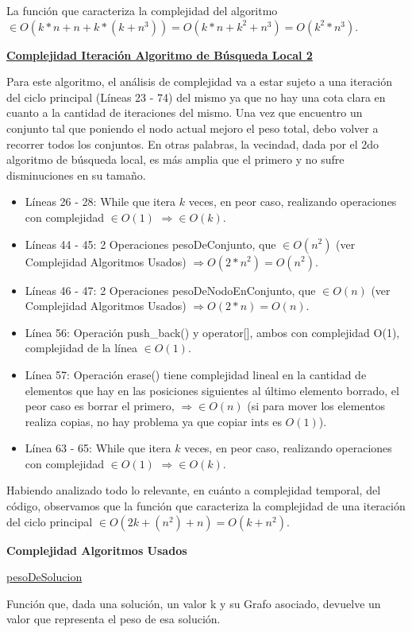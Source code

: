 \documentclass[10pt,a4paper]{article}
\begin{document}
La función que caracteriza la complejidad del algoritmo $\in O(k*n + n + k*(k + n^3)) = O(k*n + k^2 + n^3) = O(k^2 * n^3)$.

\newpage
\noindent \underline{\textbf{Complejidad Iteración Algoritmo de Búsqueda Local 2}}

Para este algoritmo, el análisis de complejidad va a estar sujeto a una iteración del ciclo principal (Líneas 23 - 74) del mismo ya que no hay una cota clara en cuanto a la cantidad de iteraciones del mismo. Una vez que encuentro un conjunto tal que poniendo el nodo actual mejoro el peso total, debo volver a recorrer todos los conjuntos. En otras palabras, la vecindad, dada por el 2do algoritmo de búsqueda local, es más amplia que el primero y no sufre disminuciones en su tamaño.

\begin{itemize}
\item Líneas 26 - 28: While que itera $k$ veces, en peor caso, realizando operaciones con complejidad $\in O(1)$ $\Rightarrow \in O(k)$.
\item Líneas 44 - 45: 2 Operaciones pesoDeConjunto, que $\in O(n^2)$ (ver Complejidad Algoritmos Usados) $\Rightarrow O(2*n^2) = O(n^2)$.
\item Líneas 46 - 47: 2 Operaciones pesoDeNodoEnConjunto, que $\in O(n)$ (ver Complejidad Algoritmos Usados) $\Rightarrow O(2*n) = O(n)$.
\item Línea 56: Operación push\_back() y operator[], ambos con complejidad O(1), complejidad de la línea $\in O(1)$.
\item Línea 57: Operación erase() tiene complejidad lineal en la cantidad de elementos que hay en las posiciones siguientes al último elemento borrado, el peor caso es borrar el primero, $\Rightarrow \in O(n)$ (si para mover los elementos realiza copias, no hay problema ya que copiar ints es $O(1)$).
\item Línea 63 - 65: While que itera $k$ veces, en peor caso, realizando operaciones con complejidad $\in O(1)$ $\Rightarrow \in O(k)$.
\end{itemize}

Habiendo analizado todo lo relevante, en cuánto a complejidad temporal, del código, observamos que la función que caracteriza la complejidad de una iteración del ciclo principal $\in O(2k + (n^2) + n) = O(k + n^2)$.

\textbf{Complejidad Algoritmos Usados}

\underline{pesoDeSolucion}

Función que, dada una solución, un valor k y su Grafo asociado, devuelve un valor que representa el peso de esa solución.
\end{document}
